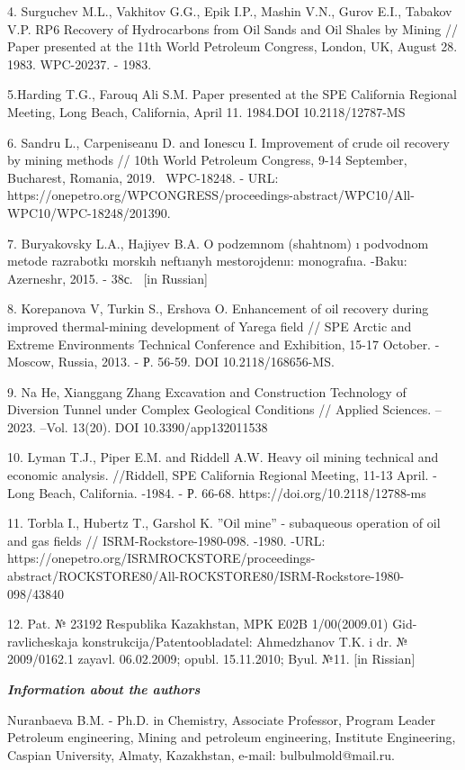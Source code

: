 4. Surguchev M.L., Vakhitov G.G., Epik I.P., Mashin V.N., Gurov E.I.,
Tabakov V.P. RP6 Recovery of Hydrocarbons from Oil Sands and Oil Shales
by Mining // Paper presented at the 11th World Petroleum Congress,
London, UK, August 28. 1983. WPC-20237. - 1983.

5.Harding T.G., Farouq Ali S.M. Paper presented at the SPE California
Regional Meeting, Long Beach, California, April 11. 1984.DOI
10.2118/12787-MS

6. Sandru L., Carpeniseanu D. and Ionescu I. Improvement of crude oil
recovery by mining methods // 10th World Petroleum Congress, 9-14
September, Bucharest, Romania, 2019. ~WPC-18248. - URL:
https://onepetro.org/WPCONGRESS/proceedings-abstract/WPC10/All-WPC10/WPC-18248/201390.

7. Buryakovsky L.A., Hajiyev B.A. O podzemnom (shahtnom) ı podvodnom
metode razrabotkı morskıh neftıanyh mestorojdenıı: monografııa. -Baku:
Azerneshr, 2015. - 38с. ~{[}in Russian{]}

8. Korepanova V, Turkin S., Ershova O. Enhancement of oil recovery
during improved thermal-mining development of Yarega field // SPE Arctic
and Extreme Environments Technical Conference and Exhibition, 15-17
October. - Moscow, Russia, 2013. - Р. 56-59. DOI 10.2118/168656-MS.

9. Na He, Xianggang Zhang Excavation and Construction Technology of
Diversion Tunnel under Complex Geological Conditions // Applied
Sciences. -- 2023. --Vol. 13(20). DOI 10.3390/app132011538

10. Lyman T.J., Piper E.M. and Riddell A.W. Heavy oil mining technical
and economic analysis. //Riddell, SPE California Regional Meeting, 11-13
April. - Long Beach, California. -1984. - Р. 66-68.
https://doi.org/10.2118/12788-ms

11. Torbla I., Hubertz T., Garshol K. ''Oil mine'' - subaqueous
operation of oil and gas fields // ISRM-Rockstore-1980-098. -1980. -URL:
https://onepetro.org/ISRMROCKSTORE/proceedings-abstract/ROCKSTORE80/All-ROCKSTORE80/ISRM-Rockstore-1980-098/43840

12. Pat. № 23192 Respublika Kazakhstan, MPK E02B 1/00(2009.01)
Gid-ravlicheskaja konstrukcija/Patentoobladatel\textquotesingle:
Ahmedzhanov T.K. i dr. № 2009/0162.1 zayavl. 06.02.2009; opubl.
15.11.2010; Byul. №11. {[}in Rissian{]}

\emph{{\bfseries Information about the authors}}

Nuranbaeva B.M. - Ph.D. in Chemistry, Associate Professor, Program
Leader Petroleum engineering, Mining and petroleum engineering,
Institute Engineering, Caspian University, Almaty, Kazakhstan, e-mail:
bulbulmold@mail.ru.

